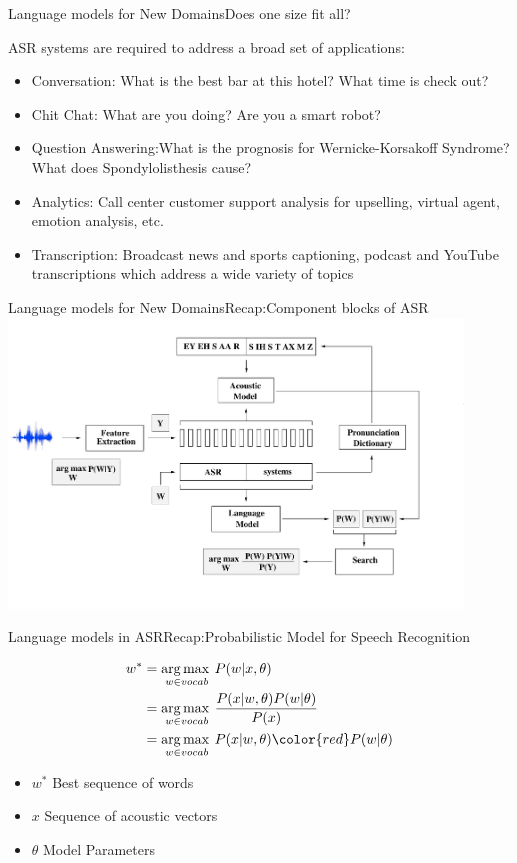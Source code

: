 \begin{frame} {Language models for New Domains}{Does one size fit all?}

ASR systems are required to address a broad set of applications:
 \begin{itemize}
 \item  {\color{red}Conversation:} What is the best bar at this hotel?  What time is check out?
 \item  {\color{red}Chit Chat:} What are you doing? Are you a smart robot?
 \item  {\color{red}Question Answering:}What is the prognosis for Wernicke-Korsakoff Syndrome? What does Spondylolisthesis cause?
 \item  {\color{red} Analytics:} Call center customer support analysis for upselling, virtual agent, emotion analysis, etc.
 \item {\color{red}Transcription:} Broadcast news and sports captioning, podcast and YouTube transcriptions which address a wide variety of topics
 \end{itemize}

\end{frame}

\begin{frame}{Language models for New Domains}{Recap:Component blocks of ASR}
\includegraphics[height=77mm]{figures/ASR9}
\end{frame}

\begin{frame} {Language models in ASR}{Recap:Probabilistic Model for Speech Recognition}

\begin{align*}
w^* & = \argmax_{w \in vocab} P(w | x, \theta) \\
       & = \argmax_{w \in vocab} \frac{P(x | w, \theta) P(w | \theta)} { P(x)} \\
       & = \argmax_{w \in vocab} P(x | w, \theta)  { \color{red} P(w | \theta)} \\
\end{align*}

\begin{itemize}
\item $w^*$  Best sequence of words
\item $x$ Sequence of acoustic vectors
\item $\theta$  Model Parameters
\end{itemize}
\end{frame}

